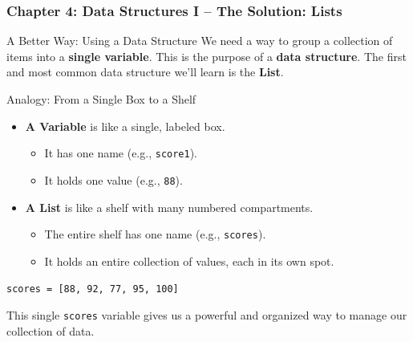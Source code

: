 \documentclass{beamer}
\begin{document}
\begin{frame}[fragile]
    \frametitle{Chapter 4: Data Structures I -- The Solution: Lists}

    \begin{block}{A Better Way: Using a Data Structure}
        We need a way to group a collection of items into a \textbf{single variable}. This is the purpose of a \textbf{data structure}.
        \medskip
        The first and most common data structure we'll learn is the \textbf{List}.
    \end{block}

    \pause

    \begin{block}{Analogy: From a Single Box to a Shelf}
        \begin{itemize}
            \item \textbf{A Variable} is like a single, labeled box.
            \begin{itemize}
                \item It has one name (e.g., \texttt{score1}).
                \item It holds one value (e.g., \texttt{88}).
            \end{itemize}
            \medskip
            \item \textbf{A List} is like a shelf with many numbered compartments.
            \begin{itemize}
                \item The entire shelf has one name (e.g., \texttt{scores}).
                \item It holds an entire collection of values, each in its own spot.
            \end{itemize}
        \end{itemize}
    \end{block}
    
    \pause
    
    \begin{center}
        \Large \texttt{scores = [88, 92, 77, 95, 100]}
    \end{center}

    \vfill
    This single \texttt{scores} variable gives us a powerful and organized way to manage our collection of data.

\end{frame}
\end{document}
